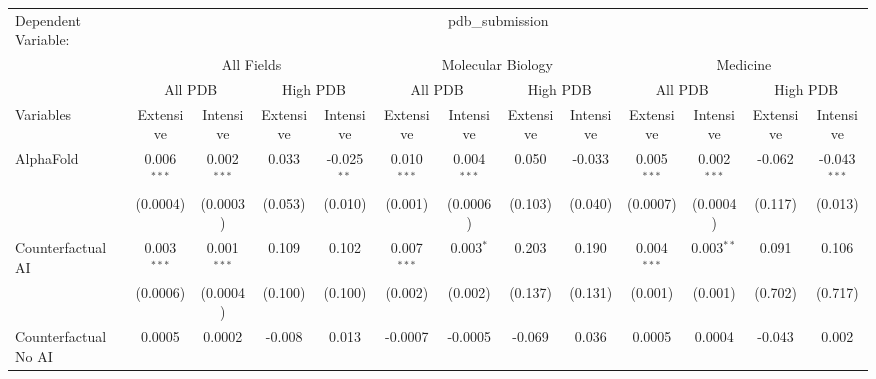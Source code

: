 \begingroup
\centering
\begin{tabular}{lcccccccccccc}
   \tabularnewline \midrule \midrule
   Dependent Variable: & \multicolumn{12}{c}{pdb\_submission}\\
 & \multicolumn{4}{c}{All Fields} & \multicolumn{4}{c}{Molecular Biology} & \multicolumn{4}{c}{Medicine} \\
\cmidrule(lr){2-5} \cmidrule(lr){6-9} \cmidrule(lr){10-13}
 & \multicolumn{2}{c}{All PDB} & \multicolumn{2}{c}{High PDB} & \multicolumn{2}{c}{All PDB} & \multicolumn{2}{c}{High PDB} & \multicolumn{2}{c}{All PDB} & \multicolumn{2}{c}{High PDB} \\
\cmidrule(lr){2-3} \cmidrule(lr){4-5} \cmidrule(lr){6-7} \cmidrule(lr){8-9} \cmidrule(lr){10-11} \cmidrule(lr){12-13}
Variables & \multicolumn{1}{c}{Extensive} & \multicolumn{1}{c}{Intensive} & \multicolumn{1}{c}{Extensive} & \multicolumn{1}{c}{Intensive} & \multicolumn{1}{c}{Extensive} & \multicolumn{1}{c}{Intensive} & \multicolumn{1}{c}{Extensive} & \multicolumn{1}{c}{Intensive} & \multicolumn{1}{c}{Extensive} & \multicolumn{1}{c}{Intensive} & \multicolumn{1}{c}{Extensive} & \multicolumn{1}{c}{Intensive} \\
\cmidrule(lr){1-1}\cmidrule(lr){2-2} \cmidrule(lr){3-3} \cmidrule(lr){4-4} \cmidrule(lr){5-5} \cmidrule(lr){6-6} \cmidrule(lr){7-7} \cmidrule(lr){8-8} \cmidrule(lr){9-9} \cmidrule(lr){10-10} \cmidrule(lr){11-11} \cmidrule(lr){12-12} \cmidrule(lr){13-13}
   AlphaFold                                & 0.006$^{***}$ & 0.002$^{***}$   & 0.033   & -0.025$^{**}$ & 0.010$^{***}$ & 0.004$^{***}$ & 0.050        & -0.033       & 0.005$^{***}$  & 0.002$^{***}$   & -0.062  & -0.043$^{***}$\\   
                                            & (0.0004)      & (0.0003)        & (0.053) & (0.010)       & (0.001)       & (0.0006)      & (0.103)      & (0.040)      & (0.0007)       & (0.0004)        & (0.117) & (0.013)\\   
   Counterfactual AI                        & 0.003$^{***}$ & 0.001$^{***}$   & 0.109   & 0.102         & 0.007$^{***}$ & 0.003$^{*}$   & 0.203        & 0.190        & 0.004$^{***}$  & 0.003$^{**}$    & 0.091   & 0.106\\   
                                            & (0.0006)      & (0.0004)        & (0.100) & (0.100)       & (0.002)       & (0.002)       & (0.137)      & (0.131)      & (0.001)        & (0.001)         & (0.702) & (0.717)\\   
   Counterfactual No AI                     & 0.0005        & 0.0002          & -0.008  & 0.013         & -0.0007       & -0.0005       & -0.069       & 0.036        & 0.0005         & 0.0004          & -0.043  & 0.002\\   

\end{tabular}
